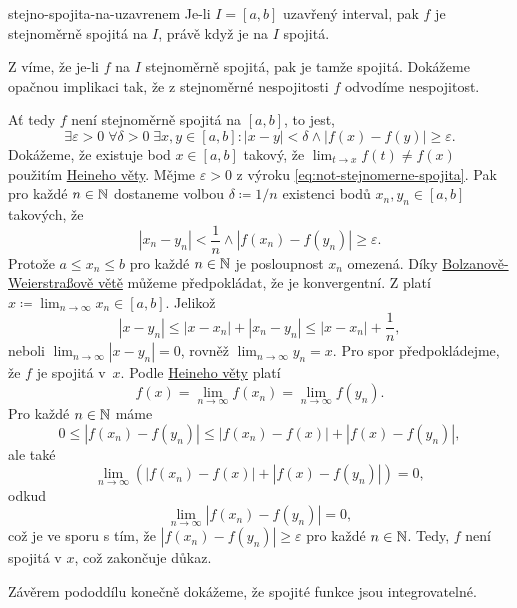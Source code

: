 \begin{theorem}{}{stejno-spojita-na-uzavrenem}
 Je-li $I = [a,b]$ uzavřený interval, pak $f$ je stejnoměrně spojitá na $I$,
 právě když je na $I$ spojitá.
\end{theorem}
\begin{thmproof}
 Z  víme, že je-li $f$ na $I$
 stejnoměrně spojitá, pak je tamže spojitá. Dokážeme opačnou implikaci tak, že z
 stejnoměrné nespojitosti $f$ odvodíme nespojitost.

 Ať tedy $f$ není stejnoměrně spojitá na $[a,b]$, to jest,
 \begin{equation}
  \label{eq:not-stejnomerne-spojita}
  \exists \varepsilon>0 \; \forall \delta>0 \; \exists x,y \in [a,b] : |x-y|
  <\delta \wedge |f(x) - f(y)| \geq \varepsilon.
 \end{equation}
 Dokážeme, že existuje bod $x \in [a,b]$ takový, že $\lim_{t \to x} f(t) \neq
 f(x)$ použitím \hyperref[cor:heineho-pro-spojitost]{Heineho věty}. Mějme
 $\varepsilon>0$ z výroku \eqref{eq:not-stejnomerne-spojita}. Pak pro každé
 $n \in \mathbb{N}$ dostaneme volbou $\delta \coloneqq 1 / n$ existenci bodů $x_n,y_n
 \in [a,b]$ takových, že
 \[
  |x_n - y_n|<\frac{1}{n} \wedge |f(x_n) - f(y_n)| \geq \varepsilon.
 \]
 Protože $a \leq x_n \leq b$ pro každé $n \in \mathbb{N}$ je posloupnost $x_n$ omezená.
 Díky \hyperref[thm:bolzano-weierstrass]{Bolzanově-Weierstraßově větě} můžeme
 předpokládat, že je konvergentní. Z 
 platí $x \coloneqq \lim_{n \to \infty} x_n \in [a,b]$. Jelikož
 \[
  |x-y_n| \leq |x-x_n| + |x_n-y_n| \leq |x-x_n| + \frac{1}{n},
 \]
 neboli $\lim_{n \to \infty} |x-y_n| = 0$, rovněž $\lim_{n \to \infty} y_n = x$.
 Pro spor předpokládejme, že $f$ je spojitá v~$x$. Podle
 \hyperref[cor:heineho-pro-spojitost]{Heineho věty} platí
 \[
  f(x) = \lim_{n \to \infty} f(x_n) = \lim_{n \to \infty} f(y_n).
 \]
 Pro každé $n \in \mathbb{N}$ máme
 \[
  0 \leq |f(x_n) - f(y_n)| \leq |f(x_n) - f(x)| + |f(x) - f(y_n)|,
 \]
 ale také
 \[
  \lim_{n \to \infty} (|f(x_n) - f(x)| + |f(x) - f(y_n)|) = 0,
 \]
 odkud
 \[
  \lim_{n \to \infty} |f(x_n) - f(y_n)| = 0,
 \]
 což je ve sporu s tím, že $|f(x_n) - f(y_n)| \geq \varepsilon$ pro každé $n \in
 \mathbb{N}$. Tedy, $f$ není spojitá v $x$, což zakončuje důkaz.
\end{thmproof}

Závěrem pododdílu konečně dokážeme, že spojité funkce jsou integrovatelné.

